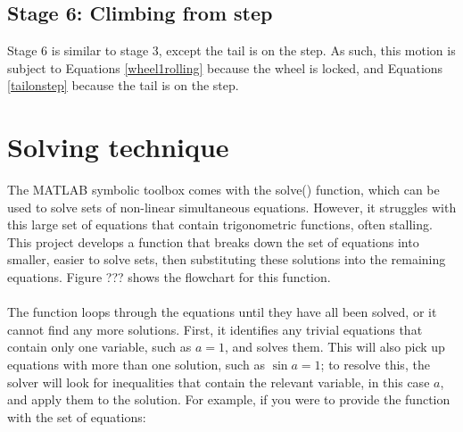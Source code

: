 \subsection*{Stage 6: Climbing from step}
Stage 6 is similar to stage 3, except the tail is on the step. As such, this motion is subject to Equations \ref{wheel1rolling} because the wheel is locked, and Equations \ref{tailonstep} because the tail is on the step.\\

\section{Solving technique}
The MATLAB symbolic toolbox comes with the solve() function, which can be used to solve sets of non-linear simultaneous equations. However, it struggles with this large set of equations that contain trigonometric functions, often stalling. This project develops a function that breaks down the set of equations into smaller, easier to solve sets, then substituting these solutions into the remaining equations. Figure ??? shows the flowchart for this function. \\
\\
The function loops through the equations until they have all been solved, or it cannot find any more solutions. First, it identifies any trivial equations that contain only one variable, such as $a = 1$, and solves them. This will also pick up equations with more than one solution, such as $\sin{a} = 1$; to resolve this, the solver will look for inequalities that contain the relevant variable, in this case $a$, and apply them to the solution. For example, if you were to provide the function with the set of equations:\\


